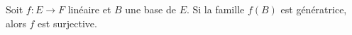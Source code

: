 Soit $f : E \to F$ linéaire et $B$  une base de $E$. Si la famille $f(B)$ est génératrice, alors $f$ est surjective.

\begin{reponses}
\end{reponses}

